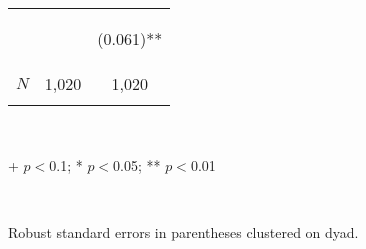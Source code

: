 \begin{center}
\begin{tabular}{lcc}
 & \begin{footnotesize}\end{footnotesize} & \begin{footnotesize}(0.061)**\end{footnotesize}\\
\noalign{\smallskip}$N$ & 1,020 & 1,020\\
\noalign{\smallskip}\hline\end{tabular}\\
\smallskip\begin{footnotesize}+ $p<0$.1; * $p<0$.05; ** $p<0$.01\end{footnotesize}\\
\begin{footnotesize}Robust standard errors in parentheses clustered on dyad.\end{footnotesize}\\
\smallskip
\end{center}
